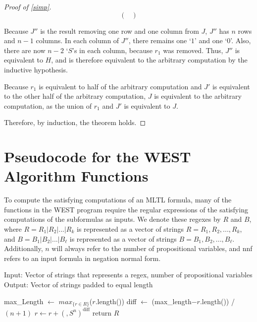 \documentclass[runningheads]{llncs}
\begin{document}
\begin{proof}[Proof of \ref{simp}]
\[\begin{pmatrix}
  \end{pmatrix}
\]

Because $J''$ is the result removing one row and one column from $J$, $J''$ has $n$ rows and $n-1$ columns. In each column of $J''$, there remains one `$1$' and one `$0$'. Also, there are now $n-2$ `$S$'s in each column, because $r_1$ was removed. Thus, $J''$ is equivalent to $H$, and is therefore equivalent to the arbitrary computation by the inductive hypothesis.

Because $r_1$ is equivalent to half of the arbitrary computation and $J'$ is equivalent to the other half of the arbitrary computation, $J$ is equivalent to the arbitrary computation, as the union of $r_1$ and $J'$ is equivalent to $J$.

Therefore, by induction, the theorem holds.
\end{proof}

\section{Pseudocode for the WEST Algorithm Functions} \label{pseudocode appendix}
 
To compute the satisfying computations of an MLTL formula, many of the functions in the WEST program require the regular expressions of the satisfying computations of the subformulas as inputs. We denote these regexes by $R$ and $B$, where $R = R_1 | R_2 | ... | R_k$ is represented as a vector of strings $R = {R_1, R_2, ..., R_k}$, and $B = B_1 | B_2 | ... | B_\ell$ is represented as a vector of strings $B = {B_1, B_2, ..., B_\ell}$. Additionally, $n$ will always refer to the number of propositional variables, and nnf refers to an input formula in negation normal form.

\begin{algorithm}[H]
\caption{Pad a vector to elements of all equal length}
Input: Vector of strings that represents a regex, number of propositional variables \\
Output: Vector of strings padded to equal length
\begin{algorithmic}

    \State max\_Length $\leftarrow$ $max_{\{r \in R\}}$($r$.length()) 
        \State diff $\leftarrow$ (max\_length$- r$.length()) / $(n+1)$ 
        \State  $r \leftarrow r + (,S^n)^{\text{diff}}$
    \EndFor
    \State return $R$
    
\EndProcedure

\end{algorithmic}
\end{algorithm}
\end{document}
